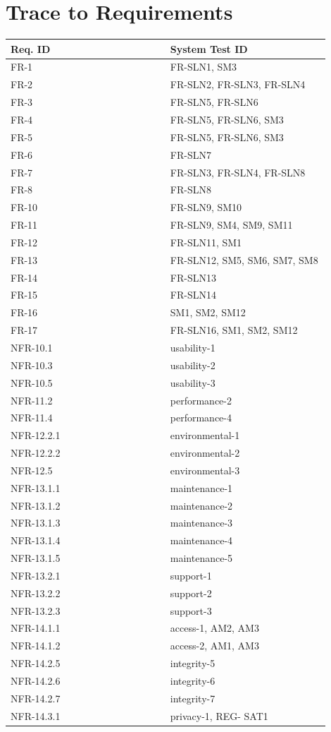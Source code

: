\documentclass[12pt, titlepage]{article}
\begin{document}
\section{Trace to Requirements}
\begin{longtable}{|p{0.45\linewidth}|p{0.45\linewidth}|}
\hline
\textbf{Req. ID} & \textbf{System Test ID} \\
\hline
FR-1 & FR-SLN1, SM3 \\
\hline
FR-2 & FR-SLN2, FR-SLN3, FR-SLN4 \\
\hline
FR-3 & FR-SLN5, FR-SLN6 \\
\hline
FR-4 & FR-SLN5, FR-SLN6, SM3 \\
\hline
FR-5 & FR-SLN5, FR-SLN6, SM3 \\
\hline
FR-6 & FR-SLN7 \\
\hline
FR-7 & FR-SLN3, FR-SLN4, FR-SLN8 \\
\hline
FR-8 & FR-SLN8 \\
\hline
FR-10 & FR-SLN9, SM10 \\
\hline
FR-11 & FR-SLN9, SM4, SM9, SM11 \\
\hline
FR-12 & FR-SLN11, SM1 \\
\hline
FR-13 & FR-SLN12, SM5, SM6, SM7, SM8 \\
\hline
FR-14 & FR-SLN13 \\
\hline
FR-15 & FR-SLN14 \\
\hline
FR-16 & SM1, SM2, SM12 \\
\hline
FR-17 & FR-SLN16, SM1, SM2, SM12 \\
\hline
NFR-10.1 & usability-1 \\
\hline
NFR-10.3 & usability-2 \\
\hline
NFR-10.5 & usability-3 \\
\hline
NFR-11.2 & performance-2 \\
\hline
NFR-11.4 & performance-4 \\
\hline
NFR-12.2.1 & environmental-1 \\
\hline
NFR-12.2.2 & environmental-2 \\
\hline
NFR-12.5 & environmental-3 \\
\hline
NFR-13.1.1 & maintenance-1 \\
\hline
NFR-13.1.2 & maintenance-2 \\
\hline
NFR-13.1.3 & maintenance-3 \\
\hline
NFR-13.1.4 & maintenance-4 \\
\hline
NFR-13.1.5 & maintenance-5 \\
\hline
NFR-13.2.1 & support-1 \\
\hline
NFR-13.2.2 & support-2 \\
\hline
NFR-13.2.3 & support-3 \\
\hline
NFR-14.1.1 & access-1, AM2, AM3 \\
\hline
NFR-14.1.2 & access-2, AM1, AM3 \\
\hline
NFR-14.2.5 & integrity-5 \\
\hline
NFR-14.2.6 & integrity-6 \\
\hline
NFR-14.2.7 & integrity-7 \\
\hline
NFR-14.3.1 & privacy-1, REG-
SAT1 \\
\hline
\end{longtable}
\end{document}
